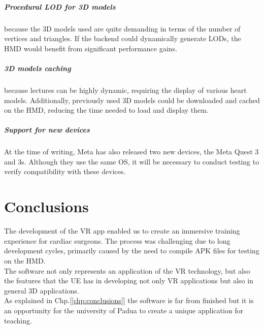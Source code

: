 \paragraph{Procedural \ac{LOD} for 3D models}
because the 3D models used are quite demanding in terms of the number of vertices and triangles. If the backend could dynamically generate \ac{LOD}s, the \ac{HMD} would benefit from significant performance gains.

\paragraph{3D models caching}
because lectures can be highly dynamic, requiring the display of various heart models. Additionally, previously used 3D models could be downloaded and cached on the \ac{HMD}, reducing the time needed to load and display them.

\paragraph{Support for new devices}
At the time of writing, Meta has also released two new devices, the Meta Quest 3 and 3s. Although they use the same \ac{OS}, it will be necessary to conduct testing to verify compatibility with these devices.


\chapter{Conclusions}
\noindent
The development of the \ac{VR} app enabled us to create an immersive training experience for cardiac surgeons.
The process was challenging due to long development cycles, primarily caused by the need to compile \ac{APK} files for testing on the \ac{HMD}.\\
The software not only represents an application of the \ac{VR} technology, but also the features  that the \ac{UE} has in developing not only \ac{VR} applications but also in general 3D applications.\\
As explained in Chp.[\ref{chp:conclusions}] the software is far from finished but it is an opportunity for the university of Padua to create a unique application for teaching.\\